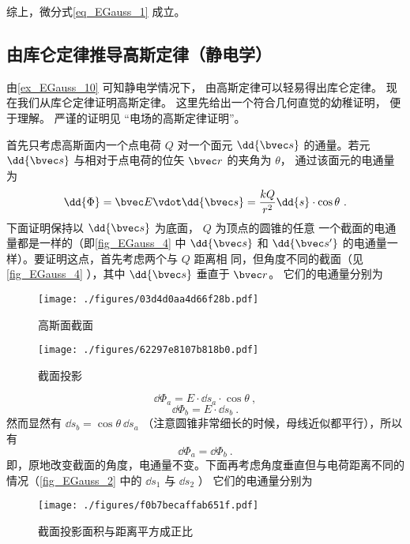 综上，微分式\autoref{eq_EGauss_1} 成立。
\subsection{由库仑定律推导高斯定律（静电学）}
由\autoref{ex_EGauss_10} 可知静电学情况下， 由高斯定律可以轻易得出库仑定律。 现在我们从库仑定律证明高斯定律。 这里先给出一个符合几何直觉的幼稚证明， 便于理解。 严谨的证明见 “电场的高斯定律证明”。

首先只考虑高斯面内一个点电荷 $Q$ 对一个面元 $\dd{\bvec s}$ 的通量。若元 $\dd{\bvec s}$ 与相对于点电荷的位矢 $\bvec r$ 的夹角为 $\theta$， 通过该面元的电通量为
\begin{equation}
\dd{\Phi} = \bvec E \vdot \dd{\bvec s} = \frac{kQ}{r^2} \dd{s} \cdot \cos \theta ~.
\end{equation} 
下面证明保持以 $\dd{\bvec s}$ 为底面， $Q$ 为顶点的圆锥的任意
一个截面的电通量都是一样的（即\autoref{fig_EGauss_4} 中 $\dd{\bvec s}$ 和 $\dd{\bvec s'}$ 的电通量一样）。要证明这点，首先考虑两个与 $Q$ 距离相
同，但角度不同的截面（见\autoref{fig_EGauss_4} ），其中 $\dd{\bvec s}$ 垂直于 $\bvec r$。 它们的电通量分别为
\begin{figure}[ht]
\centering
\texttt{[image: ./figures/03d4d0aa4d66f28b.pdf]}
\caption{高斯面截面}\label{fig_EGauss_3}
\end{figure}
\begin{figure}[ht]
\centering
\texttt{[image: ./figures/62297e8107b818b0.pdf]}
\caption{截面投影}\label{fig_EGauss_4}
\end{figure}

\begin{equation}
\dd{\Phi_a} = E \cdot \dd{s_a} \cdot \cos \theta ~,
\end{equation} 
\begin{equation}
\dd{\Phi_b} = E \cdot \dd{s_b}~.
\end{equation}
然而显然有 $\dd{s_b} = \cos\theta \ \dd{s_a} $ （注意圆锥非常细长的时候，母线近似都平行），所以有
\begin{equation}
\dd{\Phi_a} = \dd{\Phi_b}~.
\end{equation} 
即，原地改变截面的角度，电通量不变。下面再考虑角度垂直但与电荷距离不同的情况（\autoref{fig_EGauss_2} 中的 $\dd{s_1}$ 与 $\dd{s_2}$ ） 它们的电通量分别为
\begin{figure}[ht]
\centering
\texttt{[image: ./figures/f0b7becaffab651f.pdf]}
\caption{截面投影面积与距离平方成正比} \label{fig_EGauss_2}
\end{figure}

